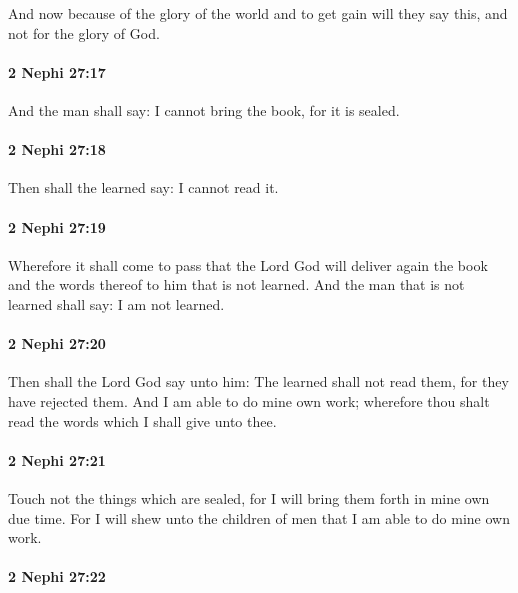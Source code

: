 			And now because of the glory of the world and to get gain will they say this,
			and not for the glory of God.

		\paragraph{2 Nephi 27:17} %
			\label{2NEPHI-27-17}

			And the man shall say:
			I cannot bring the book, for it is sealed.

		\paragraph{2 Nephi 27:18} %
			\label{2NEPHI-27-18}

			Then shall the learned say:
			I cannot read it.

		\paragraph{2 Nephi 27:19} %
			\label{2NEPHI-27-19}

			Wherefore it shall come to pass that
			the Lord God will deliver again the book and the words thereof
			to him that is not learned.
			And the man that is not learned shall say:
			I am not learned.

		\paragraph{2 Nephi 27:20} %
			\label{2NEPHI-27-20}

			Then shall the Lord God say unto him:
			The learned shall not read them,
			for they have rejected them.
			And I am able to do mine own work;
			wherefore thou shalt read the words which I shall give unto thee.

		\paragraph{2 Nephi 27:21} %
			\label{2NEPHI-27-21}

			Touch not the things which are sealed,
			for I will bring them forth in mine own due time.
			For I will shew unto the children of men that I am able to do mine own work.

		\paragraph{2 Nephi 27:22} %
			\label{2NEPHI-27-22}

